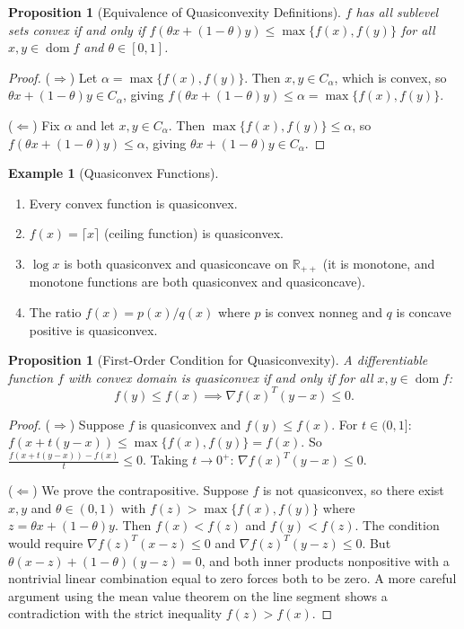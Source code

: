 \documentclass[11pt,a4paper]{article}
\newtheorem{proposition}[theorem]{Proposition}
\theoremstyle{definition}
\newtheorem{example}[theorem]{Example}
\theoremstyle{remark}
\newcommand{\R}{\mathbb{R}}
\DeclareMathOperator{\dom}{dom}
\begin{document}
\begin{proposition}[Equivalence of Quasiconvexity Definitions]
\label{prop:quasiconvex-equiv}
$f$ has all sublevel sets convex if and only if $f(\theta x + (1-\theta)y) \le
\max\{f(x), f(y)\}$ for all $x, y \in \dom f$ and $\theta \in [0,1]$.
\end{proposition}

\begin{proof}
($\Rightarrow$) Let $\alpha = \max\{f(x), f(y)\}$. Then $x, y \in C_\alpha$, which is
convex, so $\theta x + (1-\theta) y \in C_\alpha$, giving
$f(\theta x + (1-\theta) y) \le \alpha = \max\{f(x), f(y)\}$.

($\Leftarrow$) Fix $\alpha$ and let $x, y \in C_\alpha$. Then $\max\{f(x), f(y)\} \le
\alpha$, so $f(\theta x + (1-\theta) y) \le \alpha$, giving
$\theta x + (1-\theta) y \in C_\alpha$.
\end{proof}

\begin{example}[Quasiconvex Functions]
\label{ex:quasiconvex}
\begin{enumerate}[label=(\alph*)]
  \item Every convex function is quasiconvex.
  \item $f(x) = \lceil x \rceil$ (ceiling function) is quasiconvex.
  \item $\log x$ is both quasiconvex and quasiconcave on $\R_{++}$ (it is monotone, and
        monotone functions are both quasiconvex and quasiconcave).
  \item The ratio $f(x) = p(x)/q(x)$ where $p$ is convex nonneg and $q$ is concave
        positive is quasiconvex.
\end{enumerate}
\end{example}

\begin{proposition}[First-Order Condition for Quasiconvexity]
\label{prop:quasiconvex-first-order}
A differentiable function $f$ with convex domain is quasiconvex if and only if for all
$x, y \in \dom f$:
\[
  f(y) \le f(x) \implies \nabla f(x)^T(y - x) \le 0.
\]
\end{proposition}

\begin{proof}
($\Rightarrow$) Suppose $f$ is quasiconvex and $f(y) \le f(x)$. For $t \in (0,1]$:
$f(x + t(y-x)) \le \max\{f(x), f(y)\} = f(x)$. So $\frac{f(x+t(y-x)) - f(x)}{t}
\le 0$. Taking $t \to 0^+$: $\nabla f(x)^T(y - x) \le 0$.

($\Leftarrow$) We prove the contrapositive. Suppose $f$ is not quasiconvex, so there
exist $x, y$ and $\theta \in (0,1)$ with $f(z) > \max\{f(x), f(y)\}$ where
$z = \theta x + (1-\theta) y$. Then $f(x) < f(z)$ and $f(y) < f(z)$. The condition
would require $\nabla f(z)^T(x - z) \le 0$ and $\nabla f(z)^T(y - z) \le 0$. But
$\theta(x-z) + (1-\theta)(y-z) = 0$, and both inner products nonpositive with a
nontrivial linear combination equal to zero forces both to be zero. A more careful
argument using the mean value theorem on the line segment shows a contradiction with
the strict inequality $f(z) > f(x)$.
\end{proof}
\end{document}
